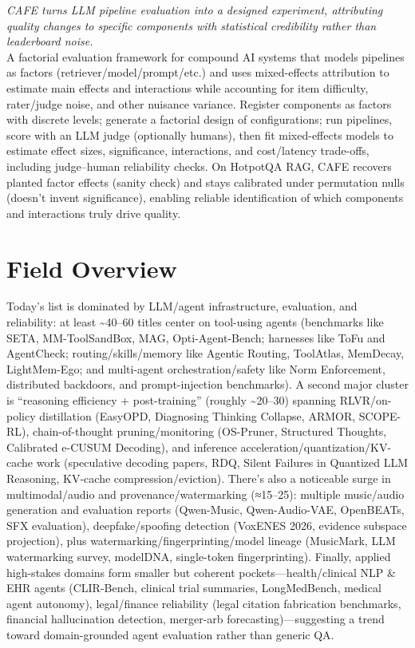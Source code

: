 \documentclass[12pt,letterpaper]{article}
\begin{document}
{\small\textit{CAFE turns LLM pipeline evaluation into a designed experiment, attributing quality changes to specific components with statistical credibility rather than leaderboard noise.}}\\[1pt]
{\footnotesize A factorial evaluation framework for compound AI systems that models pipelines as factors (retriever/model/prompt/etc.) and uses mixed-effects attribution to estimate main effects and interactions while accounting for item difficulty, rater/judge noise, and other nuisance variance. Register components as factors with discrete levels; generate a factorial design of configurations; run pipelines, score with an LLM judge (optionally humans), then fit mixed-effects models to estimate effect sizes, significance, interactions, and cost/latency trade-offs, including judge--human reliability checks. On HotpotQA RAG, CAFE recovers planted factor effects (sanity check) and stays calibrated under permutation nulls (doesn't invent significance), enabling reliable identification of which components and interactions truly drive quality.}

\medskip



\section*{Field Overview}
{\footnotesize Today's list is dominated by LLM/agent infrastructure, evaluation, and reliability: at least \textasciitilde{}40--60 titles center on tool-using agents (benchmarks like SETA, MM-ToolSandBox, MAG, Opti-Agent-Bench; harnesses like ToFu and AgentCheck; routing/skills/memory like Agentic Routing, ToolAtlas, MemDecay, LightMem-Ego; and multi-agent orchestration/safety like Norm Enforcement, distributed backdoors, and prompt-injection benchmarks). A second major cluster is ``reasoning efficiency + post-training'' (roughly \textasciitilde{}20--30) spanning RLVR/on-policy distillation (EasyOPD, Diagnosing Thinking Collapse, ARMOR, SCOPE-RL), chain-of-thought pruning/monitoring (OS-Pruner, Structured Thoughts, Calibrated e-CUSUM Decoding), and inference acceleration/quantization/KV-cache work (speculative decoding papers, RDQ, Silent Failures in Quantized LLM Reasoning, KV-cache compression/eviction). There's also a noticeable surge in multimodal/audio and provenance/watermarking (≈15--25): multiple music/audio generation and evaluation reports (Qwen-Music, Qwen-Audio-VAE, OpenBEATs, SFX evaluation), deepfake/spoofing detection (VoxENES 2026, evidence subspace projection), plus watermarking/fingerprinting/model lineage (MusicMark, LLM watermarking survey, modelDNA, single-token fingerprinting). Finally, applied high-stakes domains form smaller but coherent pockets---health/clinical NLP \& EHR agents (CLIR-Bench, clinical trial summaries, LongMedBench, medical agent autonomy), legal/finance reliability (legal citation fabrication benchmarks, financial hallucination detection, merger-arb forecasting)---suggesting a trend toward domain-grounded agent evaluation rather than generic QA.}
\end{document}
